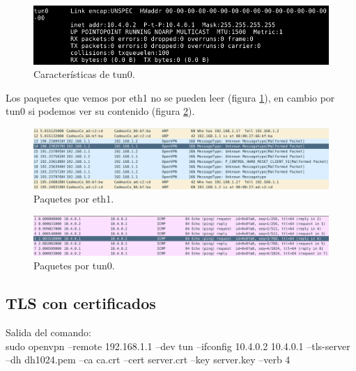 \documentclass[11pt]{article}
\begin{document}
      \begin{figure}[H]
        \centering
        \includegraphics[width = \textwidth]{tun0}
        \caption{Características de tun0.}
      \end{figure}

      \par
      Los paquetes que vemos por eth1 no se pueden leer (figura
      \ref{figure:pingeth1}), en cambio por tun0 si podemos ver su contenido
      (figura \ref{figure:pingtun0}).

      \begin{figure}[H]
        \centering
        \includegraphics[width = \textwidth]{pingeth1}
        \caption{Paquetes por eth1.}
        \label{figure:pingeth1}
      \end{figure}

      \begin{figure}[H]
        \centering
        \includegraphics[width = \textwidth]{pingtun0}
        \caption{Paquetes por tun0.}
        \label{figure:pingtun0}
      \end{figure}

    \subsection{TLS con certificados}
    \par
    Salida del comando:\\
    sudo openvpn --remote 192.168.1.1 --dev tun --ifconfig 10.4.0.2 10.4.0.1 --tls-server --dh dh1024.pem --ca ca.crt --cert server.crt --key server.key --verb 4
\end{document}
